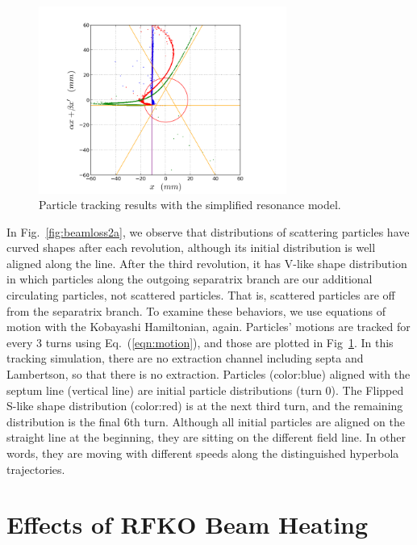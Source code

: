 \documentclass[aps,prstab,onecolumn,preprint]{revtex4-1}
\begin{document}
\begin{figure}[!tbp]
  \includegraphics[width=3.2in]{img/fig_beamloss3}
  \caption{\label{fig:beamloss3} Particle tracking results with the simplified resonance model.}
\end{figure}

In Fig.~\ref{fig:beamloss2a}, we observe that distributions of scattering particles have curved shapes after each revolution, although its initial distribution is well aligned along the line. After the third revolution, it has V-like shape distribution in which particles along the outgoing separatrix branch are our additional circulating particles, not scattered particles. That is, scattered particles are off from the separatrix branch. To examine these behaviors, we use equations of motion with the Kobayashi Hamiltonian, again. Particles' motions are tracked for every 3 turns using Eq.~(\ref{eqn:motion}), and those are plotted in Fig~\ref{fig:beamloss3}. In this tracking simulation, there are no extraction channel including septa and Lambertson, so that there is no extraction. Particles (color:blue) aligned with the septum line (vertical line) are initial particle distributions (turn 0). The Flipped S-like shape distribution (color:red) is at the next third turn, and the remaining distribution is the final 6th turn. Although all initial particles are aligned on the straight line at the beginning, they are sitting on the different field line. In other words, they are moving with different speeds along the distinguished hyperbola trajectories. 


\section{\label{sec:rfko}Effects of RFKO Beam Heating}
\end{document}
